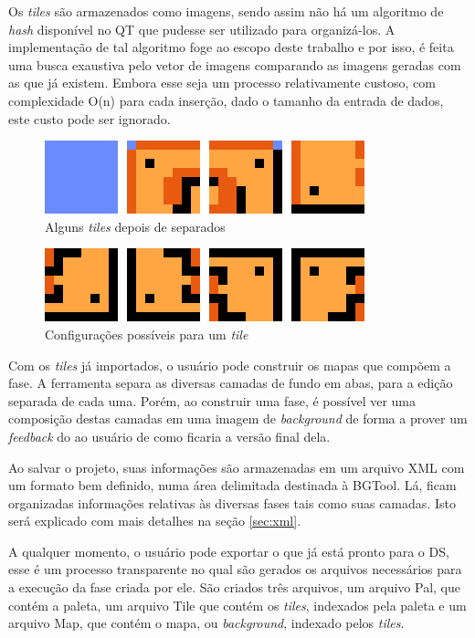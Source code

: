 \documentclass[brazil]{abnt}
\begin{document}
Os \textit{tiles} são armazenados como imagens, sendo assim não há um algoritmo de \textit{hash} disponível no QT que pudesse ser utilizado para organizá-los. A implementação de tal algoritmo foge ao escopo deste trabalho e por isso, é feita uma busca exaustiva pelo vetor de imagens comparando as imagens geradas com as que já existem. Embora esse seja um processo relativamente custoso, com complexidade O(n) para cada inserção, dado o tamanho da entrada de dados, este custo pode ser ignorado.

\begin{figure}[h!]
\centering
\includegraphics[scale=1]{imgs/tiles1.png}
\caption{Alguns \textit{tiles} depois de separados}
\label{fig:tiles1}
\end{figure}

\begin{figure}[h!]
\centering
\includegraphics[scale=1]{imgs/tiles2.png}
\caption{Configurações possíveis para um \textit{tile}}
\label{fig:tiles2}
\end{figure}

Com os \textit{tiles} já importados, o usuário pode construir os mapas que compõem a fase. A ferramenta separa as diversas camadas de fundo em abas, para a edição separada de cada uma. Porém, ao construir uma fase, é possível ver uma composição destas camadas em uma imagem de \textit{background} de forma a prover um \textit{feedback} do ao usuário de como ficaria a versão final dela.

Ao salvar o projeto, suas informações são armazenadas em um arquivo XML com um formato bem definido, numa área delimitada destinada à BGTool. Lá, ficam organizadas informações relativas às diversas fases tais como suas camadas. Isto será explicado com mais detalhes na seção \ref{sec:xml}.

A qualquer momento, o usuário pode exportar o que já está pronto para o DS, esse é um processo transparente no qual são gerados os arquivos necessários para a execução da fase criada por ele. São criados três arquivos, um arquivo Pal, que contém a paleta, um arquivo Tile que contém os \textit{tiles}, indexados pela paleta e um arquivo Map, que contém o mapa, ou \textit{background}, indexado pelos \textit{tiles}.
\end{document}
